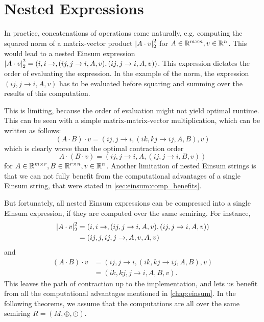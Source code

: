 \chapter{Nested Expressions}
\label{chap:nested}

In practice, concatenations of operations come naturally, e.g. computing the squared norm of a matrix-vector product $\left\lvert A \cdot v \right\rvert_2^2$
for $A \in \mathbb{R}^{m \times n}, v \in \mathbb{R}^n$.
This would lead to a nested Einsum expression $\left\lvert A \cdot v \right\rvert_2^2 = (i,i \rightarrow , (ij, j \rightarrow i, A, v), (ij, j \rightarrow i, A, v))$.
This expression dictates the order of evaluating the expression.
In the example of the norm, the expression $(ij, j \rightarrow i, A, v)$ has to be evaluated before squaring and summing over the results of this computation.

This is limiting, because the order of evaluation might not yield optimal runtime.
This can be seen with a simple matrix-matrix-vector multiplication, which can be written as follows:
$$(A \cdot B) \cdot v = (ij, j \rightarrow i, (ik, kj \rightarrow ij, A, B), v)$$
which is clearly worse than the optimal contraction order
$$A \cdot (B \cdot v) = (ij, j \rightarrow i, A, (ij, j \rightarrow i, B, v))$$
for $A \in \mathbb{R}^{m \times r}, B \in \mathbb{R}^{r \times n}, v \in \mathbb{R}^n$.
Another limitation of nested Einsum strings is that we can not fully benefit from the computational advantages of a single Einsum string, that were stated in \autoref{sec:einsum:comp_benefits}.

But fortunately, all nested Einsum expressions can be compressed into a single Einsum expression, if they are computed over the same semiring.
For instance,
\begin{align*}
    \left\lvert A \cdot v \right\rvert_2^2 & = (i,i \rightarrow , (ij, j \rightarrow i, A, v), (ij, j \rightarrow i, A, v)) \\
                        & = (ij, j, ij, j \rightarrow, A, v, A, v)
\end{align*}
and
\begin{align*}
    (A \cdot B) \cdot v & = (ij, j \rightarrow i, (ik, kj \rightarrow ij, A, B), v) \\
                        & = (ik, kj, j \rightarrow i, A, B, v).
\end{align*}
This leaves the path of contraction up to the implementation, and lets us benefit from all the computational advantages mentioned in \autoref{chap:einsum}.
In the following theorems, we assume that the computations are all over the same semiring $R = (M, \oplus, \odot)$.


